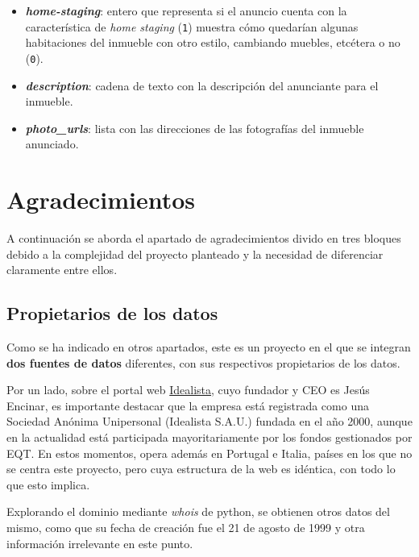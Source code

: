 \documentclass[12pt]{article}
\begin{document}
\begin{itemize}[topsep=0cm,partopsep=0cm]
	\item \textbf{\textit{home-staging}}: entero que representa si el anuncio cuenta con la característica de \textit{home staging} (\verb|1|) \textemdash muestra cómo quedarían algunas habitaciones del inmueble con otro estilo, cambiando muebles, etcétera \textemdash  o no (\verb|0|).
	\item \textbf{\textit{description}}: cadena de texto con la descripción del anunciante para el inmueble.
	\item \textbf{\textit{photo\_urls}}: lista con las direcciones de las fotografías del inmueble anunciado.
\end{itemize}

\vspace{-1.5em}\section{Agradecimientos}\vspace{-1.0em}

A continuación se aborda el apartado de agradecimientos divido en tres bloques debido a la complejidad del proyecto planteado y la necesidad de diferenciar claramente entre ellos. 

\vspace{-1.5em}\subsection*{Propietarios de los datos}\vspace{-1.0em}

Como se ha indicado en otros apartados, este es un proyecto en el que se integran \textbf{dos fuentes de datos} diferentes, con sus respectivos propietarios de los datos. 

Por un lado, sobre el portal web \href{http://www.idealista.com}{Idealista}, cuyo fundador y CEO es Jesús Encinar, es importante destacar que la empresa está registrada como una Sociedad Anónima Unipersonal (Idealista S.A.U.) fundada en el año 2000, aunque en la actualidad está participada mayoritariamente por los fondos gestionados por EQT. En estos momentos, opera además en Portugal e Italia, países en los que no se centra este proyecto, pero cuya estructura de la web es idéntica, con todo lo que esto implica. 

Explorando el dominio mediante \textit{whois} de python, se obtienen otros datos del mismo, como que su fecha de creación fue el 21 de agosto de 1999 y otra información irrelevante en este punto.
\end{document}
